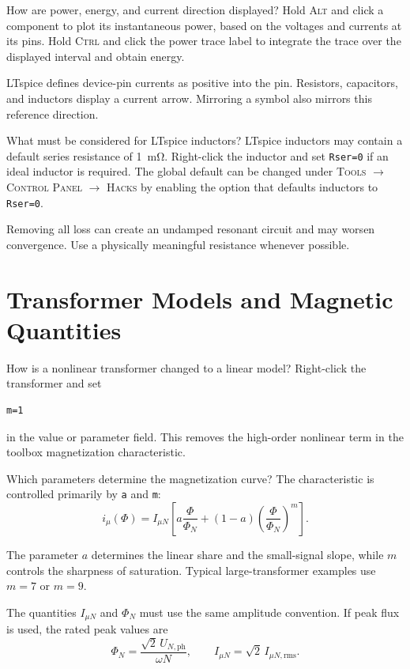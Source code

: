\begin{formulaBox}{How are power, energy, and current direction displayed?}
Hold \textsc{Alt} and click a component to plot its instantaneous power, based
on the voltages and currents at its pins. Hold \textsc{Ctrl} and click the
power trace label to integrate the trace over the displayed interval and obtain
energy.

LTspice defines device-pin currents as positive into the pin. Resistors,
capacitors, and inductors display a current arrow. Mirroring a symbol also
mirrors this reference direction.
\end{formulaBox}

\begin{formulaBox}{What must be considered for LTspice inductors?}
LTspice inductors may contain a default series resistance of
\SI{1}{\milli\ohm}. Right-click the inductor and set \texttt{Rser=0} if an
ideal inductor is required. The global default can be changed under
\textsc{Tools} $\rightarrow$ \textsc{Control Panel} $\rightarrow$
\textsc{Hacks} by enabling the option that defaults inductors to
\texttt{Rser=0}.

Removing all loss can create an undamped resonant circuit and may worsen
convergence. Use a physically meaningful resistance whenever possible.
\end{formulaBox}

\section{Transformer Models and Magnetic Quantities}

\begin{formulaBox}{How is a nonlinear transformer changed to a linear model?}
Right-click the transformer and set
\begin{lstlisting}[style=LTspice]
m=1
\end{lstlisting}
in the value or parameter field. This removes the high-order nonlinear term in
the toolbox magnetization characteristic.
\end{formulaBox}

\begin{formulaBox}{Which parameters determine the magnetization curve?}
The characteristic is controlled primarily by \texttt{a} and \texttt{m}:
\begin{equation}
i_\mu(\Phi)=I_{\mu N}
\left[
a\frac{\Phi}{\Phi_N}
+(1-a)\left(\frac{\Phi}{\Phi_N}\right)^m
\right].
\label{eq:qa-magnetization-curve}
\end{equation}

The parameter $a$ determines the linear share and the small-signal slope,
while $m$ controls the sharpness of saturation. Typical large-transformer
examples use $m=7$ or $m=9$. 

The quantities $I_{\mu N}$ and $\Phi_N$ must use the same amplitude convention.
If peak flux is used, the rated peak values are
\begin{equation}
\Phi_N=\frac{\sqrt{2}\,U_{N,\mathrm{ph}}}{\omega N},
\qquad
I_{\mu N}=\sqrt{2}\,I_{\mu N,\mathrm{rms}}.
\end{equation}
\end{formulaBox}

